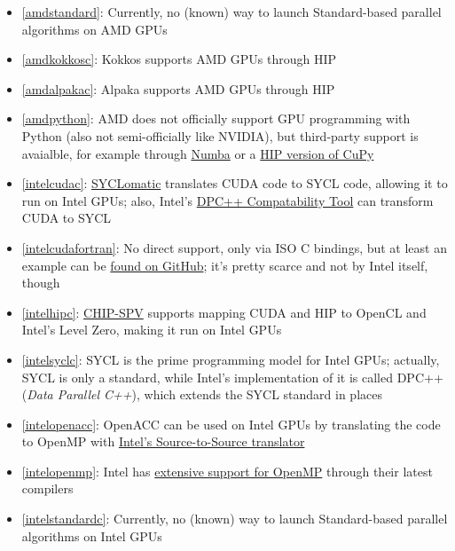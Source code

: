 \begin{itemize}
    \item \ref{amdstandard}: Currently, no (known) way to launch Standard-based parallel algorithms on AMD GPUs
    \item \ref{amdkokkosc}: Kokkos supports AMD GPUs through HIP
    \item \ref{amdalpakac}: Alpaka supports AMD GPUs through HIP
    \item \ref{amdpython}: AMD does not officially support GPU programming with Python (also not semi-officially like NVIDIA), but third-party support is avaialble, for example through \href{https://numba.pydata.org/numba-doc/latest/roc/index.html}{Numba} or a \href{https://docs.cupy.dev/en/latest/install.html?highlight=rocm\#building-cupy-for-rocm-from-source}{HIP version of CuPy}
    \item \ref{intelcudac}: \href{https://github.com/oneapi-src/SYCLomatic}{SYCLomatic} translates CUDA code to SYCL code, allowing it to run on Intel GPUs; also, Intel's \href{https://www.intel.com/content/www/us/en/developer/tools/oneapi/dpc-compatibility-tool.html}{DPC++ Compatability Tool} can transform CUDA to SYCL
    \item \ref{intelcudafortran}: No direct support, only via ISO C bindings, but at least an example can be \href{https://github.com/codeplaysoftware/SYCL-For-CUDA-Examples/tree/master/examples/fortran_interface}{found on GitHub}; it's pretty scarce and not by Intel itself, though
    \item \ref{intelhipc}: \href{https://github.com/CHIP-SPV/chip-spv}{CHIP-SPV} supports mapping CUDA and HIP to OpenCL and Intel's Level Zero, making it run on Intel GPUs
    \item \ref{intelsyclc}: SYCL is the prime programming model for Intel GPUs; actually, SYCL is only a standard, while Intel's implementation of it is called DPC++ (\emph{Data Parallel C++}), which extends the SYCL standard in places
    \item \ref{intelopenacc}: OpenACC can be used on Intel GPUs by translating the code to OpenMP with \href{https://github.com/intel/intel-application-migration-tool-for-openacc-to-openmp}{Intel's Source-to-Source translator}
    \item \ref{intelopenmp}: Intel has \href{https://www.intel.com/content/www/us/en/develop/documentation/get-started-with-cpp-fortran-compiler-openmp/top.html}{extensive support for OpenMP} through their latest compilers
    \item \ref{intelstandardc}: Currently, no (known) way to launch Standard-based parallel algorithms on Intel GPUs

\end{itemize}
